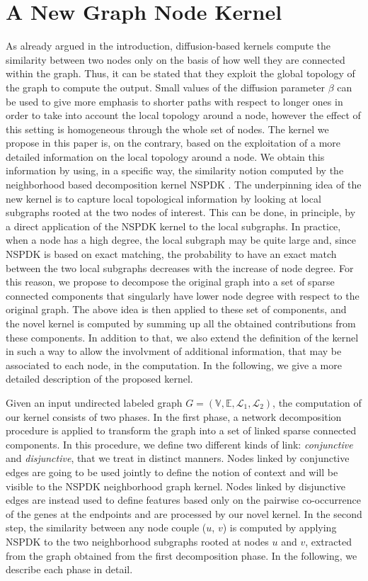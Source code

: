\documentclass[review]{elsarticle}
\begin{document}
\section{A New Graph Node Kernel}
\label{method}
As already argued in the introduction, diffusion-based kernels compute the similarity between two nodes only on the basis of how well they are connected within the graph. Thus, it can be stated that they exploit the global topology of the graph to compute the output. Small values of the diffusion parameter $\beta$ can be used to give more emphasis to shorter paths with respect to longer ones in order to take into account the local topology around a node, however the effect of this setting is homogeneous through the whole set of nodes. 
The kernel we propose in this paper is, on the contrary, based on the exploitation of a more detailed information on the local topology around a node. We obtain this information by using, in a specific way, the similarity notion computed by the neighborhood based decomposition kernel NSPDK \cite{costa2010fast}. The underpinning idea of the new kernel is to capture local topological information by looking at local  subgraphs rooted at the two nodes of interest. This can be done, in principle, by a direct application of the NSPDK kernel to the local subgraphs. In practice, when a node has a high degree, the local subgraph may be quite large and, since NSPDK is based on exact matching, the probability to have an exact match between the two local subgraphs decreases with the increase of  node degree. For this reason, we propose to decompose the original graph into a set of sparse connected components that singularly have lower node degree with respect to the original graph. The above idea is then applied to these set of components, and the novel kernel is computed by summing up all the obtained contributions from these components.  
In addition to that, we also extend the definition of the kernel in such a way to allow  the involvment  of additional information, that may be associated to each node, in the computation. In the following, we give a more detailed description of the proposed kernel.

Given an input undirected labeled graph $G=(\mathbb{V},\mathbb{E}, \mathcal{L}_1, \mathcal{L}_2)$, the computation of our kernel consists of two phases. In the first phase, a network decomposition procedure is applied to transform the graph into a set of linked sparse connected components. In this procedure, we define two different kinds of link: \textit{conjunctive} and \textit{disjunctive}, that we treat in distinct manners.
Nodes linked by conjunctive edges are going to be used jointly to define the notion of context and will be visible to the NSPDK neighborhood graph kernel. Nodes linked by disjunctive edges are instead used to define features based only on the pairwise co-occurrence of the genes at the endpoints and are processed by our novel kernel. In the second step, the similarity between any node couple ($u$, $v$) is computed by applying NSPDK to the two neighborhood subgraphs rooted at nodes $u$ and $v$, extracted from the graph obtained from the first decomposition phase. In the following, we describe each phase in detail.
\end{document}
